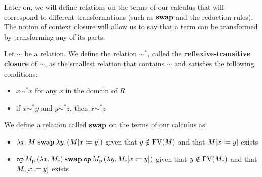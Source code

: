 Later on, we will define relations on the terms of our calculus that will
correspond to different transformations (such as $\mathbin{\textbf{swap}}$ and the reduction
rules). The notion of context closure will allow us to say that a term can
be transformed by transforming any of its parts.

\begin{definition}
  Let $\sim$ be a relation. We define the relation $\sim^*$, called the
  \textbf{reflexive-transitive closure} of $\sim$, as the smallest relation
  that contains $\sim$ and satisfies the following conditions:

  \begin{itemize}
  \item $x \sim^* x$ for any $x$ in the domain of $R$
  \item if $x \sim^* y$ and $y \sim^* z$, then $x \sim^* z$
  \end{itemize}
\end{definition}

\begin{definition}
  We define a relation called $\mathbin{\textbf{swap}}$ on the terms of our calculus as:

  \begin{itemize}
  \item $\lambda x.\, M \mathbin{\textbf{swap}} \lambda y.\, (M[x \coloneqq y])$ given that $y \notin
    \operatorname{FV}(M)$ and that $M[x \coloneqq y]$ exists


    \item $\mathtt{op}\,M_{\mathrm{p}}\,(\lambda x.\, M_{\mathrm{c}}) \mathbin{\textbf{swap}}
           \mathtt{op}\,M_{\mathrm{p}}\,(\lambda y.\, M_{\mathrm{c}}[x \coloneqq y])$
           given that $y \notin \operatorname{FV}(M_{\mathrm{c}})$ and that
           $M_{\mathrm{c}}[x \coloneqq y]$ exists
  \end{itemize}
\end{definition}

